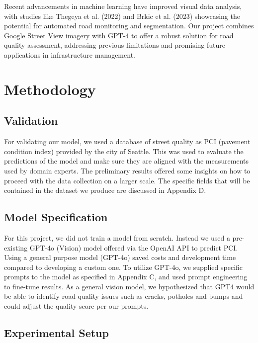 \documentclass{article}
\begin{document}
Recent advancements in machine learning have improved visual data analysis, with studies like Thegeya et al. (2022) and Brkic et al. (2023) showcasing the potential for automated road monitoring and segmentation.
Our project combines Google Street View imagery with GPT-4 to offer a robust solution for road quality assessment, addressing previous limitations and promising future applications in infrastructure management.



\section{Methodology}

\subsection{Validation}
For validating our model, we used a database of street quality as PCI (pavement condition index) provided by the city of Seattle. This was used to evaluate the predictions of the model and make sure they are aligned with the measurements used by domain experts. The preliminary results offered some insights on how to proceed with the data collection on a larger scale. The specific fields that will be contained in the dataset we produce are discussed in Appendix D.

\subsection{Model Specification}
For this project, we did not train a model from scratch. Instead we used a pre-existing GPT-4o (Vision) model offered via the OpenAI API to predict PCI. Using a general purpose model (GPT-4o) saved costs and development time compared to developing a custom one. To utilize GPT-4o, we supplied specific prompts to the model as specified in Appendix C, and used prompt engineering to fine-tune results. As a general vision model, we hypothesized that GPT4 would be able to identify road-quality issues such as cracks, potholes and bumps and could adjust the quality score per our prompts.

\subsection{Experimental Setup}
\end{document}
